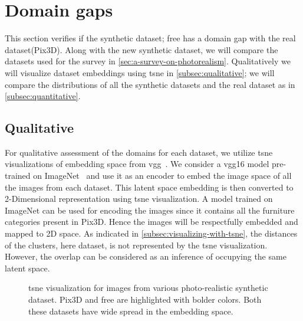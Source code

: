 \section{Domain gaps}\label{sec:domain-gaps}

This section verifies if the synthetic dataset; \gls{free} has a domain gap with the real dataset(Pix3D).
Along with the new synthetic dataset, we will compare the datasets used for the survey in \autoref{sec:a-survey-on-photorealism}.
Qualitatively we will visualize dataset embeddings using \gls{tsne} in \autoref{subsec:qualitative}; we will compare the distributions of all the synthetic datasets and the real dataset as in \autoref{subsec:quantitative}.

\subsection{Qualitative}\label{subsec:qualitative}

For qualitative assessment of the domains for each dataset, we utilize \gls{tsne} visualizations of embedding space from \gls{vgg}~\cite{simonyan2015deep}.
We consider a \gls{vgg}16 model pre-trained on ImageNet~\cite{Deng2009ImageNetAL} and use it as an encoder to embed the image space of all the images from each dataset.
This latent space embedding is then converted to 2-Dimensional representation using \gls{tsne} visualization.
A model trained on ImageNet can be used for encoding the images since it contains all the furniture categories present in Pix3D\@.
Hence the images will be respectfully embedded and mapped to 2D space.
As indicated in \autoref{subsec:visualizing-with-tsne}, the distances of the clusters, here dataset, is not represented by the \gls{tsne} visualization.
However, the overlap can be considered as an inference of occupying the same latent space.

\begin{figure}[ht]
    \centering
    \resizebox{0.9\textwidth}{8.5cm}{}
    \caption{\gls{tsne} visualization for images from various photo-realistic synthetic dataset. Pix3D and \gls{free} are highlighted with bolder colors.
    Both these datasets have wide spread in the embedding space.}
    \label{fig:photorealistic tsne}
\end{figure}

